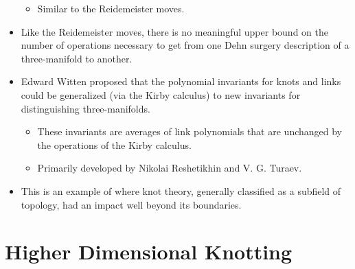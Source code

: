 \documentclass[titlepage]{article}
\numberwithin{figure}{section}
\numberwithin{table}{section}
\numberwithin{equation}{section}
\begin{document}
\begin{itemize}
    \begin{itemize}
        \item Similar to the Reidemeister moves.
    \end{itemize}
    \item Like the Reidemeister moves, there is no meaningful upper bound on the number of operations necessary to get from one Dehn surgery description of a three-manifold to another.
    \item Edward Witten proposed that the polynomial invariants for knots and links could be generalized (via the Kirby calculus) to new invariants for distinguishing three-manifolds.
    \begin{itemize}
        \item These invariants are averages of link polynomials that are unchanged by the operations of the Kirby calculus.
        \item Primarily developed by Nikolai Reshetikhin and V. G. Turaev.
    \end{itemize}
    \item This is an example of where knot theory, generally classified as a subfield of topology, had an impact well beyond its boundaries.
\end{itemize}
\newpage



\section{Higher Dimensional Knotting}
\end{document}
